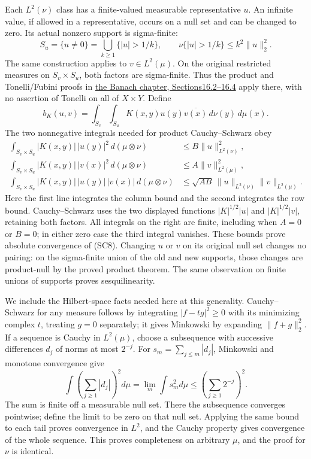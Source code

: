 \documentclass[
  11pt,
]{article}
\begin{document}
Each \(L^2(\nu)\) class has a finite-valued measurable representative
\(u\). An infinite value, if allowed in a representative, occurs on a
null set and can be changed to zero. Its actual nonzero support is
sigma-finite: \[
 S_u=\{u\ne0\}=\bigcup_{k\geq1}\{|u|>1/k\},\qquad
 \nu\{|u|>1/k\}\leq k^2\|u\|_2^2 .
 \tag{SC7}
\] The same construction applies to \(v\in L^2(\mu)\). On the original
restricted measures on \(S_v\times S_u\), both factors are sigma-finite.
Thus the product and Tonelli/Fubini proofs in
\href{banach-foundation-bridges.pdf\#section*.118}{the Banach
chapter, Sections16.2--16.4} apply there, with no assertion of Tonelli
on all of \(X\times Y\). Define \[
 b_K(u,v)=
 \int_{S_v}\int_{S_u}K(x,y)u(y)\overline{v(x)}\,d\nu(y)\,d\mu(x).
 \tag{SC8}
\] The two nonnegative integrals needed for product Cauchy--Schwarz obey
\[
 \begin{split}
 \int_{S_v\times S_u}|K(x,y)|\,|u(y)|^2\,d(\mu\otimes\nu)
 &\leq B\|u\|_{L^2(\nu)}^2,\\
 \int_{S_v\times S_u}|K(x,y)|\,|v(x)|^2\,d(\mu\otimes\nu)
 &\leq A\|v\|_{L^2(\mu)}^2,\\
 \int_{S_v\times S_u}|K(x,y)|\,|u(y)|\,|v(x)|\,d(\mu\otimes\nu)
 &\leq\sqrt{AB}\,\|u\|_{L^2(\nu)}\|v\|_{L^2(\mu)} .
 \end{split}
 \tag{SC9}
\] Here the first line integrates the column bound and the second
integrates the row bound. Cauchy--Schwarz uses the two displayed
functions \(|K|^{1/2}|u|\) and \(|K|^{1/2}|v|\), retaining both factors.
All integrals on the right are finite, including when \(A=0\) or
\(B=0\); in either zero case the third integral vanishes. These bounds
prove absolute convergence of (SC8). Changing \(u\) or \(v\) on its
original null set changes no pairing: on the sigma-finite union of the
old and new supports, those changes are product-null by the proved
product theorem. The same observation on finite unions of supports
proves sesquilinearity.

We include the Hilbert-space facts needed here at this generality.
Cauchy--Schwarz for any measure follows by integrating \(|f-tg|^2\geq0\)
with its minimizing complex \(t\), treating \(g=0\) separately; it gives
Minkowski by expanding \(\|f+g\|_2^2\). If a sequence is Cauchy in
\(L^2(\mu)\), choose a subsequence with successive differences \(d_j\)
of norms at most \(2^{-j}\). For \(s_m=\sum_{j\leq m}|d_j|\), Minkowski
and monotone convergence give \[
 \int\left(\sum_{j\geq1}|d_j|\right)^2d\mu
 =\lim_m\int s_m^2d\mu
 \leq\left(\sum_{j\geq1}2^{-j}\right)^2 .
 \tag{SC10}
\] The sum is finite off a measurable null set. There the subsequence
converges pointwise; define the limit to be zero on that null set.
Applying the same bound to each tail proves convergence in \(L^2\), and
the Cauchy property gives convergence of the whole sequence. This proves
completeness on arbitrary \(\mu\), and the proof for \(\nu\) is
identical.
\end{document}
